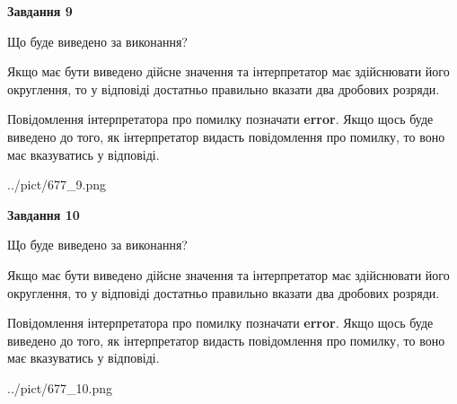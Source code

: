 \documentclass[12pt, ukrainian]{article}
\begin{document}
{\begin {Large}
{\begin {center}\textbf{Завдання 9}\end {center}}\par
Що буде виведено за виконання? \par

Якщо має бути виведено дійсне значення та інтерпретатор має здійснювати його округлення, 
то у відповіді достатньо правильно вказати два дробових розряди.

Повідомлення інтерпретатора про помилку позначати \textbf{error}.
Якщо щось буде виведено до того, як інтерпретатор видасть повідомлення про помилку, 
то воно має вказуватись у відповіді. \par

\begin{center}
	{../pict/677_9.png}
\end{center}
\newpage

{\begin {center}\textbf{Завдання 10}\end {center}}\par
Що буде виведено за виконання? \par

Якщо має бути виведено дійсне значення та інтерпретатор має здійснювати його округлення, 
то у відповіді достатньо правильно вказати два дробових розряди.

Повідомлення інтерпретатора про помилку позначати \textbf{error}.
Якщо щось буде виведено до того, як інтерпретатор видасть повідомлення про помилку, 
то воно має вказуватись у відповіді. \par

\begin{center}
	{../pict/677_10.png}
\end{center}
\newpage

\end {Large}}
\end{document}
